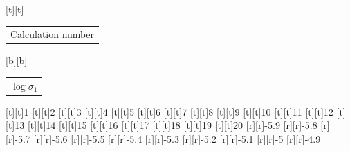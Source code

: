 %    
%
%
\begin{psfrags}%
\psfragscanon%
%
[t][t]{\color[rgb]{0,0,0}\setlength{\tabcolsep}{0pt}\begin{tabular}{c}{\Large{}Calculation number}\end{tabular}}%
[b][b]{\color[rgb]{0,0,0}\setlength{\tabcolsep}{0pt}\begin{tabular}{c}{\Large$\log \sigma_1$}\end{tabular}}%
%
[t][t]{1}%
[t][t]{2}%
[t][t]{3}%
[t][t]{4}%
[t][t]{5}%
[t][t]{6}%
[t][t]{7}%
[t][t]{8}%
[t][t]{9}%
[t][t]{10}%
[t][t]{11}%
[t][t]{12}%
[t][t]{13}%
[t][t]{14}%
[t][t]{15}%
[t][t]{16}%
[t][t]{17}%
[t][t]{18}%
[t][t]{19}%
[t][t]{20}%
%
[r][r]{-5.9}%
[r][r]{-5.8}%
[r][r]{-5.7}%
[r][r]{-5.6}%
[r][r]{-5.5}%
[r][r]{-5.4}%
[r][r]{-5.3}%
[r][r]{-5.2}%
[r][r]{-5.1}%
[r][r]{-5}%
[r][r]{-4.9}%
%
%
\end{psfrags}%
%
